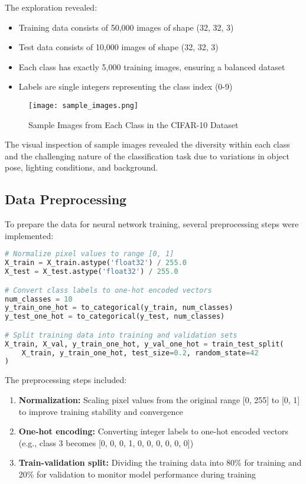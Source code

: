 \documentclass[12pt]{article}
\begin{document}
The exploration revealed:
\begin{itemize}
    \item Training data consists of 50,000 images of shape (32, 32, 3)
    \item Test data consists of 10,000 images of shape (32, 32, 3)
    \item Each class has exactly 5,000 training images, ensuring a balanced dataset
    \item Labels are single integers representing the class index (0-9)
\end{itemize}

\begin{figure}[h]
    \centering
    \texttt{[image: sample\_images.png]}
    \caption{Sample Images from Each Class in the CIFAR-10 Dataset}
\end{figure}

The visual inspection of sample images revealed the diversity within each class and the challenging nature of the classification task due to variations in object pose, lighting conditions, and background.

\subsection{Data Preprocessing}
To prepare the data for neural network training, several preprocessing steps were implemented:

\begin{lstlisting}[language=Python, caption=Data Preprocessing]
# Normalize pixel values to range [0, 1]
X_train = X_train.astype('float32') / 255.0
X_test = X_test.astype('float32') / 255.0

# Convert class labels to one-hot encoded vectors
num_classes = 10
y_train_one_hot = to_categorical(y_train, num_classes)
y_test_one_hot = to_categorical(y_test, num_classes)

# Split training data into training and validation sets
X_train, X_val, y_train_one_hot, y_val_one_hot = train_test_split(
    X_train, y_train_one_hot, test_size=0.2, random_state=42
)
\end{lstlisting}

The preprocessing steps included:
\begin{enumerate}
    \item \textbf{Normalization:} Scaling pixel values from the original range [0, 255] to [0, 1] to improve training stability and convergence
    \item \textbf{One-hot encoding:} Converting integer labels to one-hot encoded vectors (e.g., class 3 becomes [0, 0, 0, 1, 0, 0, 0, 0, 0, 0])
    \item \textbf{Train-validation split:} Dividing the training data into 80\% for training and 20\% for validation to monitor model performance during training
\end{enumerate}
\end{document}
